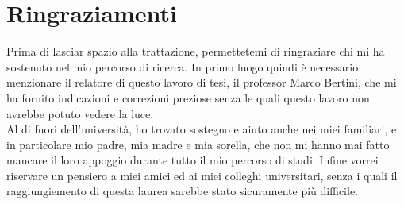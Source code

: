 \chapter{Ringraziamenti}\label{ch:ringraziamenti}
Prima di lasciar spazio alla trattazione, permettetemi di ringraziare chi mi ha sostenuto nel mio percorso di ricerca. In primo luogo quindi è necessario menzionare il relatore di questo lavoro di tesi, il professor Marco Bertini, che mi ha fornito indicazioni e correzioni preziose senza le quali questo lavoro non avrebbe potuto vedere la luce.
\\Al di fuori dell’università, ho trovato sostegno e aiuto anche nei miei familiari, e in particolare mio padre, mia madre e mia sorella, che non mi hanno mai fatto mancare il loro appoggio durante tutto il mio percorso di studi.
Infine vorrei riservare un pensiero a miei amici ed ai miei colleghi universitari, senza i quali il raggiungiemento di questa laurea sarebbe stato sicuramente più difficile.